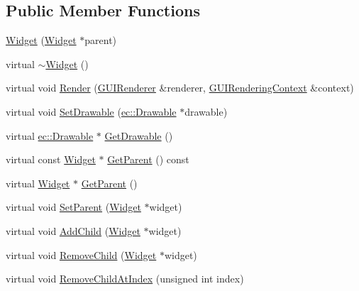 \subsection*{Public Member Functions}
\begin{DoxyCompactItemize}
\item 
\mbox{\hyperlink{classec__gui_1_1_widget_a9371f37c8a4825bc11058c0624641575}{Widget}} (\mbox{\hyperlink{classec__gui_1_1_widget}{Widget}} $\ast$parent)
\item 
virtual \mbox{\hyperlink{classec__gui_1_1_widget_a4e74d028fcbbb8b939f5017d3052578e}{$\sim$\+Widget}} ()
\item 
virtual void \mbox{\hyperlink{classec__gui_1_1_widget_a5a8b9275293ea433e6ba8fec3e7b5232}{Render}} (\mbox{\hyperlink{classec__gui_1_1_g_u_i_renderer}{G\+U\+I\+Renderer}} \&renderer, \mbox{\hyperlink{classec__gui_1_1_g_u_i_rendering_context}{G\+U\+I\+Rendering\+Context}} \&context)
\item 
virtual void \mbox{\hyperlink{classec__gui_1_1_widget_a42018848fa3f427e8e360a07ee704c07}{Set\+Drawable}} (\mbox{\hyperlink{classec_1_1_drawable}{ec\+::\+Drawable}} $\ast$drawable)
\item 
virtual \mbox{\hyperlink{classec_1_1_drawable}{ec\+::\+Drawable}} $\ast$ \mbox{\hyperlink{classec__gui_1_1_widget_a280769df6c56595e98c97d169bb27f1a}{Get\+Drawable}} ()
\item 
virtual const \mbox{\hyperlink{classec__gui_1_1_widget}{Widget}} $\ast$ \mbox{\hyperlink{classec__gui_1_1_widget_a9bd9cec7e4653bb7c4b1f3a8f26c277c}{Get\+Parent}} () const
\item 
virtual \mbox{\hyperlink{classec__gui_1_1_widget}{Widget}} $\ast$ \mbox{\hyperlink{classec__gui_1_1_widget_aa3fb528e5e28fa2a8cb8e77f13605b69}{Get\+Parent}} ()
\item 
virtual void \mbox{\hyperlink{classec__gui_1_1_widget_acc5a7ae06b4f19012f5876e6cb7b65e9}{Set\+Parent}} (\mbox{\hyperlink{classec__gui_1_1_widget}{Widget}} $\ast$widget)
\item 
virtual void \mbox{\hyperlink{classec__gui_1_1_widget_ac6e916b4ca37bff9ef9167eab55062f6}{Add\+Child}} (\mbox{\hyperlink{classec__gui_1_1_widget}{Widget}} $\ast$widget)
\item 
virtual void \mbox{\hyperlink{classec__gui_1_1_widget_a9e880c3e024f6a2a294bb1afe4458de0}{Remove\+Child}} (\mbox{\hyperlink{classec__gui_1_1_widget}{Widget}} $\ast$widget)
\item 
virtual void \mbox{\hyperlink{classec__gui_1_1_widget_af4ecf9e3bd7e672a582d574324b28a76}{Remove\+Child\+At\+Index}} (unsigned int index)

\end{DoxyCompactItemize}
